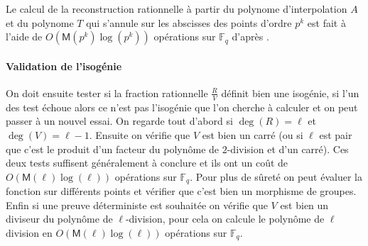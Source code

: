 \documentclass[10pt,a4paper]{book}
\theoremstyle{plain}
\theoremstyle{definition}
\newtheorem{lem}[thm]{Lemme}
\theoremstyle{definition}
\theoremstyle{definition}
\theoremstyle{definition}
\theoremstyle{remark}
\theoremstyle{remark}
\theoremstyle{definition}
\begin{document}
Le calcul de la reconstruction rationnelle à partir du polynome d'interpolation $A$ et du polynome $T$ qui s'annule sur les abscisses des points d'ordre $p^k$ est fait à l'aide de $O(\mathsf{M}(p^{k})\log(p^k))$ opérations sur $\mathbb{F}_q$ d'après \cite[§ 11.1]{vzGJG03}.

%

\paragraph{Validation de l'isogénie} \label{par:val:iso}
 On doit ensuite tester si la fraction rationnelle $\frac{R}{V}$ définit bien une isogénie, si l'un des test échoue alors ce n'est pas l'isogénie que l'on cherche à calculer et on peut passer à un nouvel essai. On regarde tout d'abord si $\deg(R)=\ell$ et $\deg(V)=\ell-1$. Ensuite on vérifie que $V$ est bien un carré (ou si $\ell$ est pair que c'est le produit d'un facteur du polynôme de $2$-division et d'un carré). Ces deux tests suffisent généralement à conclure et ils ont un coût de $O(\mathsf{M}(\ell) \log(\ell))$ opérations sur $\mathbb{F}_q$. Pour plus de sûreté on peut évaluer la fonction sur différents points et vérifier que c'est bien un morphisme de groupes. Enfin si une preuve déterministe est souhaitée on vérifie que $V$ est bien un diviseur du polynôme de $\ell$-division, pour cela on calcule le polynôme de $\ell$ division en $O(\mathsf{M}(\ell)\log(\ell))$ opérations sur $\mathbb{F}_q$. 
\end{document}
